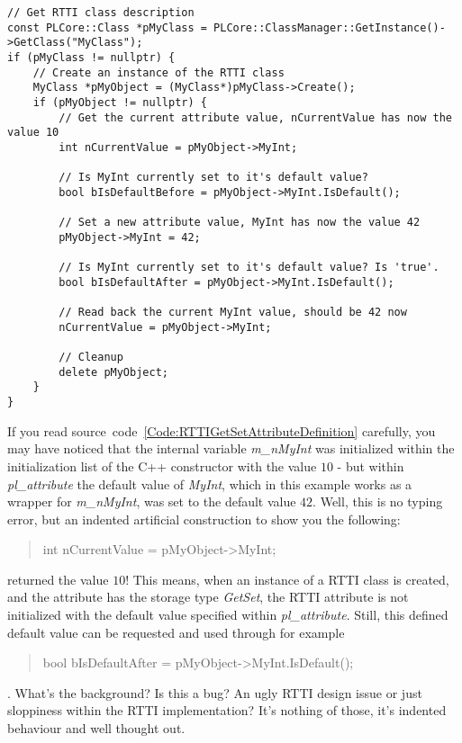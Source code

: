 \begin{lstlisting}[label=Code:RTTIGetSetAttributeUsage,caption={Accessing an \ac{RTTI} class attribute using getter and setter methods}]
// Get RTTI class description
const PLCore::Class *pMyClass = PLCore::ClassManager::GetInstance()->GetClass("MyClass");
if (pMyClass != nullptr) {
	// Create an instance of the RTTI class
	MyClass *pMyObject = (MyClass*)pMyClass->Create();
	if (pMyObject != nullptr) {
		// Get the current attribute value, nCurrentValue has now the value 10
		int nCurrentValue = pMyObject->MyInt;

		// Is MyInt currently set to it's default value?
		bool bIsDefaultBefore = pMyObject->MyInt.IsDefault();

		// Set a new attribute value, MyInt has now the value 42
		pMyObject->MyInt = 42;

		// Is MyInt currently set to it's default value? Is 'true'.
		bool bIsDefaultAfter = pMyObject->MyInt.IsDefault();

		// Read back the current MyInt value, should be 42 now
		nCurrentValue = pMyObject->MyInt;

		// Cleanup
		delete pMyObject;
	}
}
\end{lstlisting}

If you read source~code~\ref{Code:RTTIGetSetAttributeDefinition} carefully, you may have noticed that the internal variable \emph{m\_nMyInt} was initialized within the initialization list of the C++ constructor with the value $10$ - but within \emph{pl\_attribute} the default value of \emph{MyInt}, which in this example works as a wrapper for \emph{m\_nMyInt}, was set to the default value $42$. Well, this is no typing error, but an indented artificial construction to show you the following: \begin{quote}int nCurrentValue = pMyObject->MyInt;\end{quote} returned the value $10$! This means, when an instance of a \ac{RTTI} class is created, and the attribute has the storage type \emph{GetSet}, the \ac{RTTI} attribute is not initialized with the default value specified within \emph{pl\_attribute}. Still, this defined default value can be requested and used through for example \begin{quote}bool bIsDefaultAfter = pMyObject->MyInt.IsDefault();\end{quote}. What's the background? Is this a bug? An ugly \ac{RTTI} design issue or just sloppiness within the \ac{RTTI} implementation? It's nothing of those, it's indented behaviour and well thought out.

